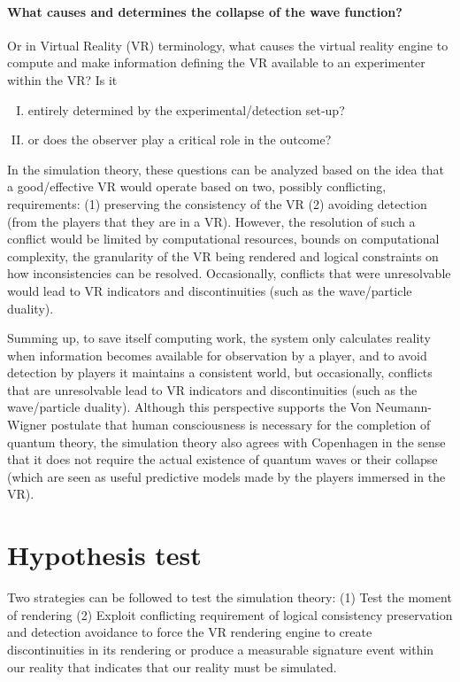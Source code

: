 \documentclass[11pt]{article}
\theoremstyle{definition}
\begin{document}
\paragraph{What causes and determines the collapse of the wave function?}  Or in Virtual Reality (VR) terminology, what causes the virtual reality engine to compute and make information defining the VR available to an experimenter within the VR?
 Is it
\begin{enumerate}[(I)]
\item entirely determined by the experimental/detection set-up?
\item or does the observer play a critical role in the outcome?
\end{enumerate}
In the simulation theory, these questions can be analyzed based on the idea that a good/effective VR would operate based on two, possibly conflicting, requirements:
 (1) preserving the consistency  of the VR (2) avoiding detection (from the players that they are in a VR).
  However, the resolution of such a conflict would be limited by computational
resources, bounds on computational complexity, the granularity of the VR being rendered and logical constraints on how inconsistencies can be resolved.  Occasionally, conflicts that were unresolvable would lead to VR indicators and discontinuities (such as the wave/particle duality).

Summing up, to save itself computing work, the system only calculates reality when information  becomes available for observation by a player, and to avoid detection by players it maintains a consistent world, but occasionally,
 conflicts that are unresolvable  lead to VR indicators and discontinuities (such as the wave/particle duality).
  Although this perspective supports the
  	Von Neumann-Wigner postulate that \cite{von1955mathematical, wigner1967symmetries} human consciousness is necessary for the completion of quantum theory, the simulation theory also agrees with Copenhagen in the sense that it does not require the actual existence of quantum waves or their collapse (which are seen as useful predictive models made by the players immersed in the VR).








\section{Hypothesis test}

Two strategies can be followed to test the simulation theory: (1) Test the moment of rendering (2) Exploit conflicting requirement of  logical consistency preservation and  detection avoidance to force the VR rendering engine  to create discontinuities in its rendering or  produce a measurable signature event within our reality that indicates that our reality must be simulated.
\end{document}
